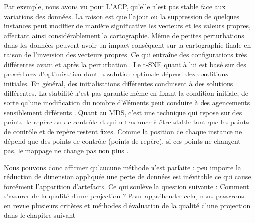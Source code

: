 Par exemple, nous avons vu pour L’ACP, qu'elle n'est pas stable face aux variations des données. La raison est que l'ajout ou la suppression de quelques instances peut modifier de manière significative les vecteurs et les valeurs propres, affectant ainsi considérablement la cartographie. Même de petites perturbations dans les données peuvent avoir un impact conséquent sur la cartographie finale en raison de l'inversion des vecteurs propres. Ce qui entraîne des configurations très différentes avant et après la perturbation \cite{nonato2018multidimensional}.
Le t-SNE quant à lui est basé sur des procédures d'optimisation dont la solution optimale dépend des conditions initiales. En général, des initialisations différentes conduisent à des solutions différentes. La stabilité n'est pas garantie même en fixant la condition initiale, de sorte qu'une modification du nombre d'éléments peut conduire à des agencements sensiblement différents \cite{garcia2013stability}.
Quant au MDS, c'est une technique qui repose sur des points de repère ou de contrôle et qui a tendance à être stable tant que les points de contrôle et de repère restent fixes. Comme la position de chaque instance ne dépend que des points de contrôle (points de repère), si ces points ne changent pas, le mappage ne change pas non plus \cite{garcia2013stability}.


Nous pouvons donc affirmer qu'aucune méthode n’est parfaite : peu importe la réduction de dimension appliquée une perte de données est inévitable ce qui cause forcément l’apparition d’artefacts. Ce qui soulève la question suivante : Comment s’assurer de la qualité d’une projection ? 
Pour appréhender cela, nous passerons en revue plusieurs critères et méthodes d'évaluation de la qualité d'une projection dans le chapitre suivant.



